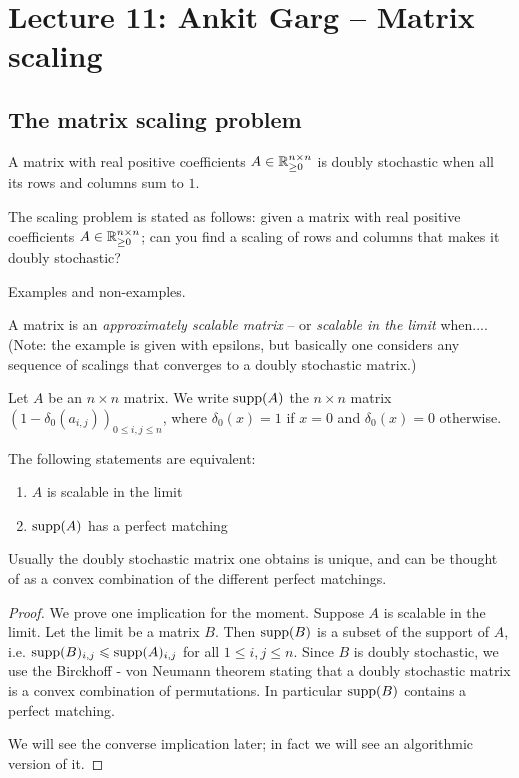 \section{Lecture 11:  Ankit Garg -- Matrix scaling}

\subsection{The matrix scaling problem}

\begin{definition}
A matrix with real positive coefficients $A\in \mathbb{R}_{\geq 0}^{n\times n}$ is doubly stochastic when all its rows and columns sum to $1$.
\end{definition}

The scaling problem is stated as follows: given a matrix with real positive coefficients $A\in \mathbb{R}_{\geq 0}^{n\times n}$; can you find a scaling of rows and columns that makes it doubly stochastic?

Examples and non-examples.

\begin{definition}
A matrix is an \emph{approximately scalable matrix} -- or \emph{scalable in the limit} when.... (Note: the example is given with epsilons, but basically one considers any sequence of scalings that converges to a doubly stochastic matrix.)
\end{definition}

\begin{definition}
Let $A$ be an $n\times n$ matrix. We write $\mathrm{supp}(A)$ the $n\times n$ matrix $(1-\delta_0(a_{i,j}))_{0\leqslant i,j \leqslant n}$, where $\delta_0(x)=1$ if $x=0$ and $\delta_0(x)=0$ otherwise.
\end{definition}

\begin{theorem}
The following statements are equivalent: 
\begin{enumerate}
\item $A$ is scalable in the limit
\item $\mathrm{supp}(A)$ has a perfect matching
\end{enumerate}
\end{theorem}

Usually the doubly stochastic matrix one obtains is unique, and can be thought of as a convex combination of the different perfect matchings.

\begin{proof}
We prove one implication for the moment. Suppose $A$ is scalable in the limit. Let the limit be a matrix $B$. Then $\mathrm{supp}(B)$ is a subset of the support of $A$, i.e. $\mathrm{supp}(B)_{i,j}\leqslant \mathrm{supp}(A)_{i,j}$ for all $1\leqslant i,j \leqslant n$. Since $B$ is doubly stochastic, we use the Birckhoff - von Neumann theorem stating that a doubly stochastic matrix is a convex combination of permutations. In particular $\mathrm{supp}(B)$ contains a perfect matching.

We will see the converse implication later; in fact we will see an algorithmic version of it.
\end{proof}

